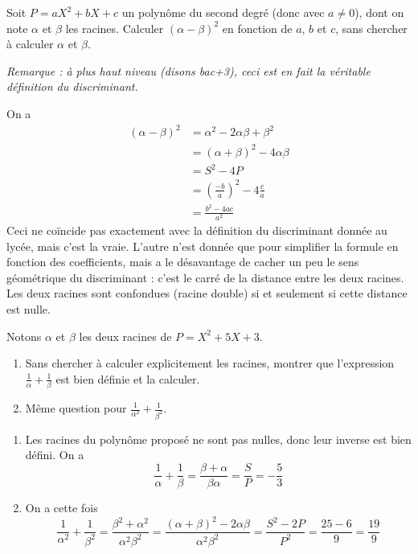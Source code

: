 \begin{exo}

Soit $P = aX^2+bX+c$ un polynôme du second degré (donc avec $a\neq 0$), dont on note $\alpha$ et $\beta$ les racines. Calculer $(\alpha-\beta)^2$ en fonction de $a$, $b$ et $c$, sans chercher à calculer $\alpha$ et $\beta$. 

\emph{Remarque : à plus haut niveau (disons bac+3), ceci est en fait la véritable définition du discriminant.}
\begin{sol}
On a 
\begin{align*}
(\alpha-\beta)^2
&= \alpha^2-2\alpha\beta + \beta^2\\
&= (\alpha+\beta)^2 - 4\alpha\beta\\
&= S^2-4P\\
&= \left(\frac{-b}{a}\right)^2 - 4\frac{c}{a}\\
&= \frac{b^2-4ac}{a^2}
\end{align*}
Ceci ne coïncide pas exactement avec la définition du discriminant donnée au lycée, mais c'est la \og vraie\fg. L'autre n'est donnée que pour simplifier la formule en fonction des coefficients, mais a le désavantage de cacher un peu le sens géométrique du discriminant : c'est le carré de la distance entre les deux racines. Les deux racines sont confondues (racine double) si et seulement si cette distance est nulle.
\end{sol}
\end{exo}

\begin{exo}
Notons $\alpha$ et $\beta$ les deux racines de $P = X^2+5X+3$.
\begin{enumerate}
\item Sans chercher à calculer explicitement les racines, montrer que l'expression $\frac{1}{\alpha}+\frac{1}{\beta}$ est bien définie et la calculer.
\item Même question pour $\frac{1}{\alpha^2}+\frac{1}{\beta^2}$.
\end{enumerate}
\begin{sol}
\begin{enumerate}
\item Les racines du polynôme proposé ne sont pas nulles, donc leur inverse est bien défini. On a 
\[\frac{1}{\alpha}+\frac{1}{\beta} 
= \frac{\beta+\alpha}{\beta\alpha}
= \frac{S}{P}
= -\frac{5}{3}\]
\item On a cette fois 
\[
\frac{1}{\alpha^2}+\frac{1}{\beta^2} 
= \frac{\beta^2+\alpha^2}{\alpha^2\beta^2}
= \frac{(\alpha+\beta)^2-2\alpha\beta}{\alpha^2\beta^2}
= \frac{S^2-2P}{P^2}
= \frac{25-6}{9} = \frac{19}{9} 
\]
\end{enumerate}

\end{sol}
\end{exo}


